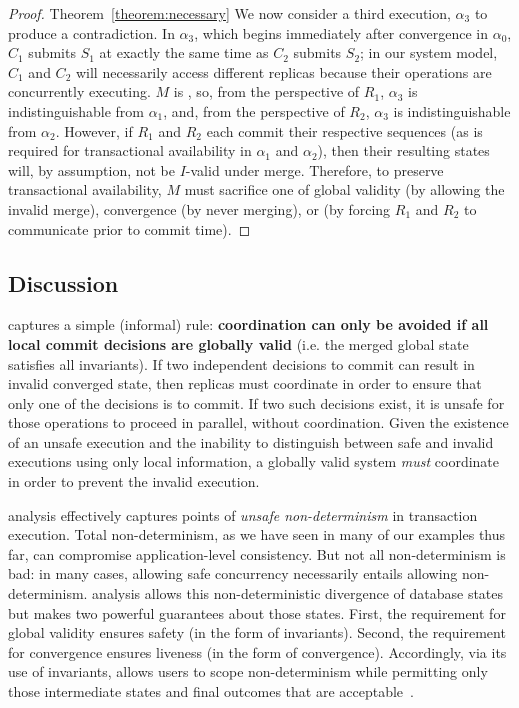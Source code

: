 \begin{proof}{Theorem~\ref{theorem:necessary}}
   We now consider a third execution, $\alpha_3$ to produce a
   contradiction. In $\alpha_3$, which begins immediately after
   convergence in $\alpha_0$, $C_1$ submits $S_1$ at exactly the same
   time as $C_2$ submits $S_2$; in our system model, $C_1$ and $C_2$
   will necessarily access different replicas because their operations
   are concurrently executing. $M$ is \cfree, so, from the perspective
   of $R_1$, $\alpha_3$ is indistinguishable from $\alpha_1$, and,
   from the perspective of $R_2$, $\alpha_3$ is indistinguishable from
   $\alpha_2$. However, if $R_1$ and $R_2$ each commit their
   respective sequences (as is required for transactional availability
   in $\alpha_1$ and $\alpha_2$), then their resulting states will, by
   assumption, not be $I$-valid under merge. Therefore, to preserve
   transactional availability, $M$ must sacrifice one of global
   validity (by allowing the invalid merge), convergence (by never
   merging), or \cfreedom (by forcing $R_1$ and $R_2$ to communicate
   prior to commit time).
\end{proof}

\subsection{Discussion}
\label{sec:theory-discussion}

\iconfluence captures a simple (informal) rule: \textbf{coordination
  can only be avoided if all local commit decisions are globally
  valid} (i.e. the merged global state satisfies all invariants). If
two independent decisions to commit can result in invalid converged
state, then replicas must coordinate in order to ensure that only one
of the decisions is to commit. If two such decisions exist, it is
unsafe for those operations to proceed in parallel, without
coordination. Given the existence of an unsafe execution and the
inability to distinguish between safe and invalid executions using
only local information, a globally valid system \textit{must}
coordinate in order to prevent the invalid execution.

\iconfluence analysis effectively captures points of \textit{unsafe
  non-determinism} in transaction execution. Total non-determinism, as
we have seen in many of our examples thus far, can compromise
application-level consistency. But not all non-determinism is bad: in
many cases, allowing safe concurrency necessarily entails allowing
non-determinism. \iconfluence analysis allows this non-deterministic
divergence of database states but makes two powerful guarantees about
those states. First, the requirement for global validity ensures
safety (in the form of invariants). Second, the requirement for
convergence ensures liveness (in the form of
convergence). Accordingly, via its use of invariants, \iconfluence
allows users to scope non-determinism while permitting only those
intermediate states and final outcomes that are
acceptable~\cite{consistency-borders}.

